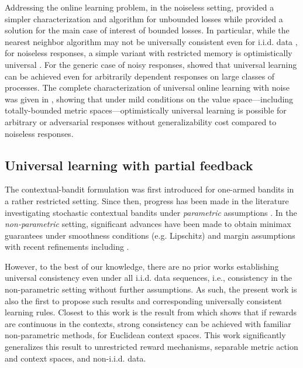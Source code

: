 \documentclass[aos]{imsart}
\theoremstyle{plain}
\theoremstyle{remark}
\newcommand{\1}{\mathbbm{1}}%
\begin{document}
Addressing the online learning problem, in the noiseless setting, \citep*{blanchard:22b} 
provided a simpler 
characterization and algorithm for unbounded losses while
\cite{blanchard:22a,blanchard:22c} provided a solution for the main case of interest of bounded losses. In particular, while the nearest neighbor algorithm may not be universally consistent even for i.i.d. data \cite{cerou2006nearest}, for noiseless responses, a simple variant with restricted memory is optimistically universal \cite{blanchard:22a}. For the generic case of noisy responses, \cite{hanneke:22a} showed that universal learning can be achieved even for arbitrarily dependent responses on large classes of processes. The complete characterization of universal online learning with noise was given in \cite{blanchard:22d}, showing that under mild conditions on the value space---including totally-bounded metric spaces---optimistically universal learning is possible for arbitrary or adversarial responses without generalizability cost compared to noiseless responses.


\subsection{Universal learning with partial feedback}

The contextual-bandit formulation was first introduced for one-armed bandits \cite{woodroofe1979one,sarkar1991one} in a rather restricted setting. Since then, progress has been made in the literature investigating stochastic contextual bandits under \emph{parametric} assumptions \cite{wang2005bandit,langford2007epoch, goldenshluger2009woodroofe,bubeck2012regret,auer2016algorithm,rakhlin2016bistro}. In the \emph{non-parametric} setting, significant advances have been made to obtain minimax guarantees under smoothness conditions (e.g. Lipschitz) and margin assumptions \cite{lu2009showing,rigollet2010nonparametric,slivkins2011contextual,perchet2013multi} with recent refinements including \cite{guan2018nonparametric,reeve2018k}.

However, to the best of our knowledge, there are no prior works establishing universal consistency even under all i.i.d. data sequences, i.e., consistency in the non-parametric setting without further assumptions. As such, the present work is also the first to propose such results and corresponding universally consistent learning rules. Closest to this work is the result from \cite{yang2002randomized} which shows that if rewards are continuous in the contexts, strong consistency can be achieved with familiar non-parametric methods, for Euclidean context spaces. This work significantly generalizes this result to unrestricted reward mechanisms, separable metric action and context spaces, and non-i.i.d. data.
\end{document}
